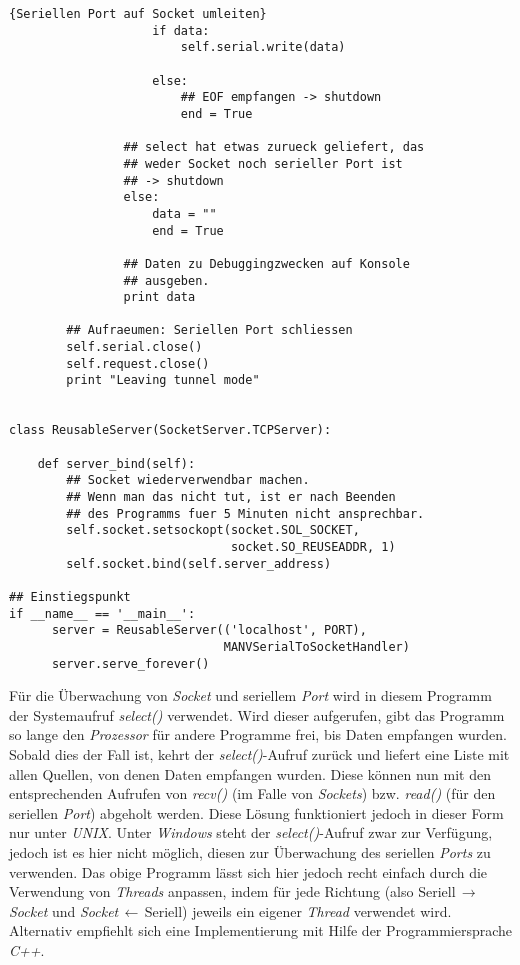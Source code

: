 \begin{lstlisting}{Seriellen Port auf Socket umleiten}
                    if data:
                        self.serial.write(data)

                    else:
                        ## EOF empfangen -> shutdown
                        end = True

                ## select hat etwas zurueck geliefert, das 
                ## weder Socket noch serieller Port ist
                ## -> shutdown
                else:
                    data = ""
                    end = True

                ## Daten zu Debuggingzwecken auf Konsole 
                ## ausgeben.
                print data

        ## Aufraeumen: Seriellen Port schliessen 
        self.serial.close()
        self.request.close()
        print "Leaving tunnel mode"


class ReusableServer(SocketServer.TCPServer):

    def server_bind(self):
        ## Socket wiederverwendbar machen.
        ## Wenn man das nicht tut, ist er nach Beenden 
        ## des Programms fuer 5 Minuten nicht ansprechbar.
        self.socket.setsockopt(socket.SOL_SOCKET,
                               socket.SO_REUSEADDR, 1)
        self.socket.bind(self.server_address)

## Einstiegspunkt 
if __name__ == '__main__':
      server = ReusableServer(('localhost', PORT), 
                              MANVSerialToSocketHandler)
      server.serve_forever()
\end{lstlisting}

Für die Überwachung von \emph{Socket} und seriellem \emph{Port} wird in diesem Programm der Systemaufruf
\emph{select()} verwendet. Wird dieser aufgerufen, gibt das Programm so lange den \emph{Prozessor}
für andere Programme frei, bis Daten empfangen wurden. Sobald dies der Fall ist, kehrt
der \emph{select()}-Aufruf zurück und liefert eine Liste mit allen Quellen, von denen Daten
empfangen wurden. Diese können nun mit den entsprechenden Aufrufen von \emph{recv()} 
(im Falle von \emph{Sockets}) bzw. \emph{read()} (für den seriellen \emph{Port}) abgeholt werden.
Diese Lösung funktioniert jedoch in dieser Form nur unter \emph{UNIX}. Unter \emph{Windows} steht der 
\emph{select()}-Aufruf zwar zur Verfügung, jedoch ist es hier nicht möglich, diesen zur
Überwachung des seriellen \emph{Ports} zu verwenden. Das obige Programm lässt sich hier jedoch
recht einfach durch die Verwendung von \emph{Threads} anpassen, indem für jede Richtung (also
Seriell$\,\rightarrow{}\,$\emph{Socket} und \emph{Socket}$\,\leftarrow{}\,$Seriell) jeweils ein eigener \emph{Thread} verwendet
wird. Alternativ empfiehlt sich eine Implementierung mit Hilfe der Programmiersprache \emph{C++}.

